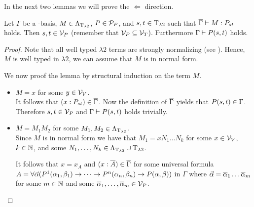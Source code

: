 In the next two lemmas we will prove the $\Leftarrow$ direction.

\begin{lemma}\label{l2h}
Let $\Gamma$ be a \SysP-basis, $M\in\Lambda_{\text{T}_{\lambda2}}$, $P\in\mathcal{P}_P$, and $\predTFst,\predTSnd\in\lambdaTypes$ such that $\trans{\Gamma}\lambdaModels M:\code{P}{\predTFst}{\predTSnd}$ holds.
Then $\predTFst, \predTSnd\in\VarP$ (remember that $\mathcal{V}_P\subseteq\mathcal{V}_T$). Furthermore $\Gamma\PModels P(\predTFst,\predTSnd)$ holds.
\end{lemma}
\begin{proof}
Note that all well typed $\lambda2$ terms are strongly normalizing (see %
). Hence, $M$ is well typed in $\lambda2$, we can assume that $M$ is in normal form. %

We now proof the lemma by structural induction on the term $M$.
\begin{itemize}
	\item[] \underline{$M=x$} for some $y\in\mathcal{V}_V$.\\
		It follows that $(x:\code{P}{\predTFst}{\predTSnd})\in\trans{\Gamma}$.
		Now the definition of $\overline{\Gamma}$ yields that $P(\predTFst,\predTSnd)\in\Gamma$. Therefore $\predTFst,\predTSnd\in\VarP$ and $\Gamma\vdash P(s,t)$ holds trivially.
	\item[] \underline{$M=M_1M_2$} for some $M_1,M_2\in\Lambda_{\text{T}_{\lambda2}}$.\\
		Since $M$ is in normal form we have that $M_1=xN_1\dots N_k$ for some $x\in\mathcal{V}_V$, $k\in\mathbb{N}$, and some $N_1,\dots,N_k\in\Lambda_{\text{T}_{\lambda2}}\cup\text{T}_{\lambda2}$. %
		
		It follows that $x=x_A$ and $(x:\overline{A})\in\overline{\Gamma}$ for some universal formula $A=\forall\predVec(P^1(\predFst[1],\predSnd[1])\to\dots\to P^n(\predFst[n],\predSnd[n])\to P(\predFst,\predSnd))$ in $\Gamma$ where $\predVec=\predVec[1]\dots\predVec[m]$ for some $m\in\mathbb{N}$ and some $\predVec[1],\dots,\predVec[m]\in\VarP$.
		

\end{itemize}
\end{proof}
